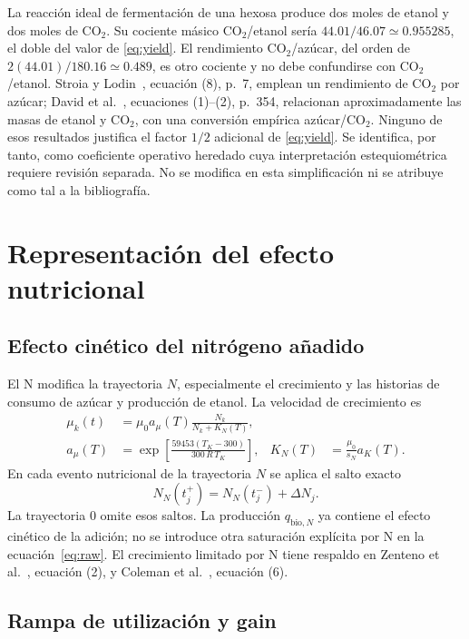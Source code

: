 \documentclass[11pt,a4paper]{article}
\begin{document}
La reacción ideal de fermentación de una hexosa produce dos moles de etanol y
dos moles de CO\(_2\). Su cociente másico CO\(_2\)/etanol sería
$44.01/46.07\simeq0.955285$, el doble del valor de
\eqref{eq:yield}. El rendimiento CO\(_2\)/azúcar, del orden de
$2(44.01)/180.16\simeq0.489$, es otro cociente y no debe confundirse con
CO\(_2\)/etanol. Stroia y Lodin~\cite{stroia2025}, ecuación (8), p.~7,
emplean un rendimiento de CO\(_2\) por azúcar; David et al.~\cite{david2012},
ecuaciones (1)--(2), p.~354, relacionan aproximadamente las masas de etanol
y CO\(_2\), con una conversión empírica azúcar/CO\(_2\).
Ninguno de esos resultados justifica el factor $1/2$ adicional de
\eqref{eq:yield}. Se identifica, por tanto, como coeficiente operativo
heredado cuya interpretación estequiométrica requiere revisión separada.
No se modifica en esta simplificación ni se atribuye como tal a la bibliografía.

\section{Representación del efecto nutricional}

\subsection{Efecto cinético del nitrógeno añadido}

El N modifica la trayectoria $N$, especialmente el crecimiento y las historias
de consumo de azúcar y producción de etanol. La velocidad de crecimiento es
\begin{align}
\mu_k(t)&=\mu_0 a_\mu(T)\frac{N_k}{N_k+K_N(T)},\label{eq:mu}\\
a_\mu(T)&=\exp\left[\frac{59453(T_K-300)}{300\,R\,T_K}\right],&
K_N(T)&=\frac{\mu_0}{s_N}a_K(T).\label{eq:KN}
\end{align}
En cada evento nutricional de la trayectoria $N$ se aplica el salto exacto
\begin{equation}
N_N(t_j^+)=N_N(t_j^-)+\Delta N_j.
\label{eq:Npulse}
\end{equation}
La trayectoria $0$ omite esos saltos. La producción
$q_{\mathrm{bio},N}$ ya contiene el efecto cinético de la adición; no se
introduce otra saturación explícita por N en la ecuación~\eqref{eq:raw}.
El crecimiento limitado por N tiene respaldo en Zenteno et al.~\cite{zenteno2010},
ecuación (2), y Coleman et al.~\cite{coleman2007}, ecuación (6).

\subsection{Rampa de utilización y gain}
\end{document}
